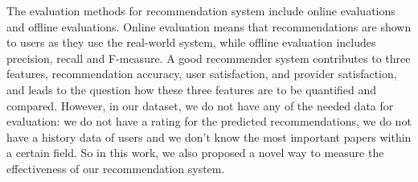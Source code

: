 The evaluation methods \cite{Beel:2013} for recommendation system include online evaluations and offline evaluations. Online evaluation means that recommendations are shown to users as they use the real-world system, while offline evaluation \cite{Ricci:2010} includes precision, recall and F-measure. A good recommender system contributes to three features, recommendation accuracy, user satisfaction, and provider satisfaction, and leads to the question how these three features are to be quantified and compared. However, in our dataset, we do not have any of the needed data for evaluation: we do not have a rating for the predicted recommendations, we do not have a history data of users and we don't know the most important papers within a certain field. So in this work, we also proposed a novel way to measure the effectiveness of our recommendation system.

